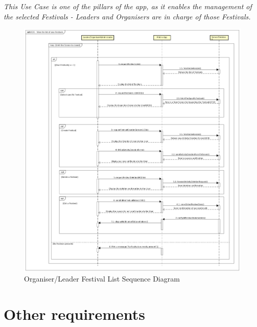 				\textit{This Use Case is one of the pillars of the app, as it enables the management of the selected Festivals - Leaders and Organisers are in charge of those Festivals.}
				\begin{figure}[H]
					\includegraphics[width=\linewidth]{diagrams/sd-diag3-festivalList.png}
					\caption{Organiser/Leader Festival List Sequence Diagram}
					\label{fig:sd3_festival_list}
				\end{figure}
				
				\eject
	
		\section{Other requirements}
			 
